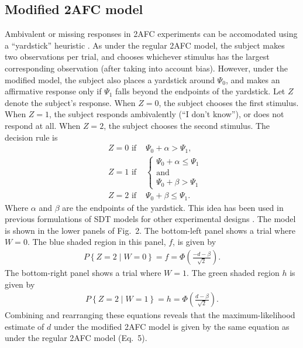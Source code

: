 \documentclass[man]{apa6}
\begin{document}
\subsection{Modified 2AFC model}
Ambivalent or missing responses in 2AFC experiments can be accomodated using a ``yardstick'' heuristic \parencite[cf.][]{decarlosignal2013}. As under the regular 2AFC model, the subject makes two observations per trial, and chooses whichever stimulus has the largest corresponding observation (after taking into account bias). However, under the modified model, the subject also places a yardstick around $\Psi_0$, and makes an affirmative response only if $\Psi_1$ falls beyond the endpoints of the yardstick. Let $Z$ denote the subject's response. When $Z=0$, the subject chooses the first stimulus. When $Z=1$, the subject responds ambivalently (``I don't know''), or does not respond at all. When $Z=2$, the subject chooses the second stimulus. The decision rule is
\begin{eqnarray*}
&Z=0\textrm{ if }&\Psi_0+\alpha>\Psi_1\textrm{,}\\
&Z=1\textrm{ if }&\left\{ \begin{array}{cl}
\Psi_0+\alpha{}\le\Psi_1\\
\textrm{and}\\
\Psi_0+\beta>\Psi_1
       \end{array} \right.\\
&Z=2\textrm{ if }&\Psi_0+\beta{}\le\Psi_1\textrm{.}
\end{eqnarray*}
Where $\alpha$ and $\beta$ are the endpoints of the yardstick. This idea has been used in previous formulations of SDT models for other experimental designs \parencite{decarlosignal2013}. The model is shown in the lower panels of Fig.~2. The bottom-left panel shows a trial where $W=0$. The blue shaded region in this panel, $f$, is given by
\begin{eqnarray*}
P\left\{Z=2\mid{}W=0\right\}=f=\Phi\left(\frac{-d-\beta}{\sqrt{2}}\right)\textrm{.}
\end{eqnarray*}
The bottom-right panel shows a trial where $W=1$. The green shaded region $h$ is given by
\begin{eqnarray*}
P\left\{Z=2\mid{}W=1\right\}=h=\Phi\left(\frac{d-\beta}{\sqrt{2}}\right)\textrm{.}
\end{eqnarray*}Combining and rearranging these equations reveals that the maximum-likelihood estimate of $d$ under the modified 2AFC model is given by the same equation as under the regular 2AFC model (Eq.~5).
\end{document}

